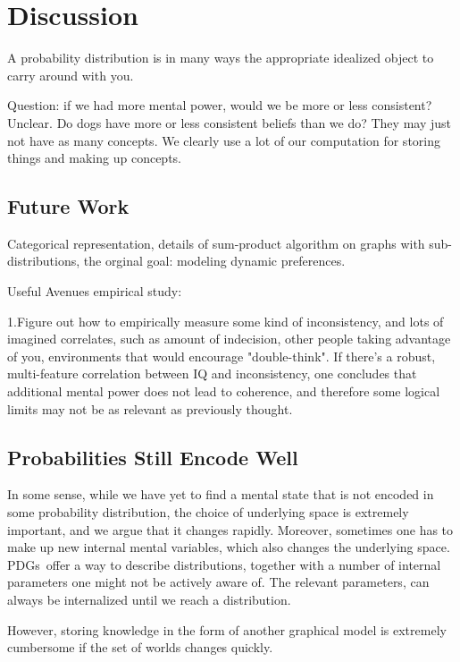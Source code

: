 \documentclass{article}
\newcommand\changeon{\color{note-fg} }
\newcommand{\MN}{PDG}
\newcommand{\MNs}{\MN s}
\begin{document}
	\section{Discussion}
	
	\changeon
	A probability distribution is in many ways the appropriate idealized object to carry around with you.
	
	Question: if we had more mental power, would we be more or less consistent? Unclear. Do dogs have more or less consistent beliefs than we do? They may just not have as many concepts. We clearly use a lot of our computation for storing things and making up concepts.
	
	
	\subsection{Future Work}
	Categorical representation, details of sum-product algorithm on graphs with sub-distributions, the orginal goal: modeling dynamic preferences.
	
	Useful Avenues empirical study: 
	
	1.Figure out how to empirically measure some kind of inconsistency, and lots of imagined correlates, such as amount of indecision, other people taking advantage of you, environments that would encourage "double-think". If there's a robust, multi-feature correlation between IQ and inconsistency, one concludes that additional mental power does not lead to coherence, and therefore some logical limits may not be as relevant as previously thought.
	
	
	

	\subsection{Probabilities Still Encode Well}	
	In some sense, while we have yet to find a mental state that is not encoded in some probability distribution, the choice of underlying space is extremely important, and we argue that it changes rapidly. Moreover, sometimes one has to make up new internal mental variables, which also changes the underlying space. \MNs\ offer a way to describe distributions, together with a number of internal parameters one might not be actively aware of. The relevant parameters, can always be internalized  until we reach a distribution. 
	
	However, storing knowledge in the form of another graphical model is extremely cumbersome if the set of worlds changes quickly.	
\end{document}
